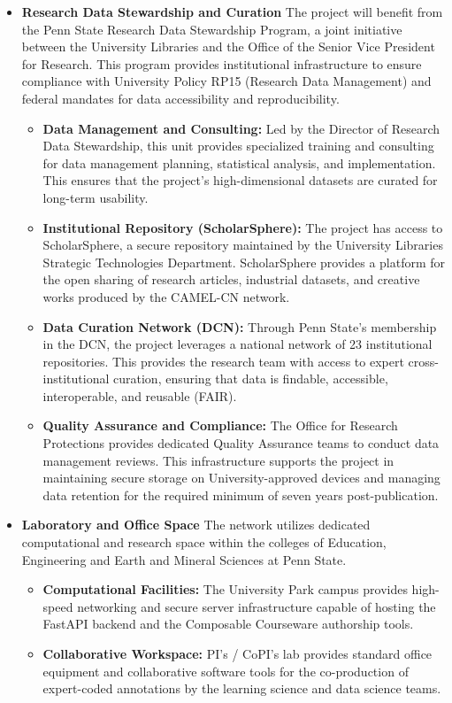\documentclass[11pt]{article}
\begin{document}
\begin{itemize}
\item \textbf{Research Data Stewardship and Curation}
The project will benefit from the Penn State Research Data Stewardship Program, a joint initiative between the University Libraries and the Office of the Senior Vice President for Research. This program provides institutional infrastructure to ensure compliance with University Policy RP15 (Research Data Management) and federal mandates for data accessibility and reproducibility.
    \begin{itemize}[noitemsep]
        \item \textbf{Data Management and Consulting:} Led by the Director of Research Data Stewardship, this unit provides specialized training and consulting for data management planning, statistical analysis, and implementation. This ensures that the project’s high-dimensional datasets are curated for long-term usability.
        \item \textbf{Institutional Repository (ScholarSphere):} The project has access to ScholarSphere, a secure repository maintained by the University Libraries Strategic Technologies Department. ScholarSphere provides a platform for the open sharing of research articles, industrial datasets, and creative works produced by the CAMEL-CN network.
        \item \textbf{Data Curation Network (DCN):} Through Penn State’s membership in the DCN, the project leverages a national network of 23 institutional repositories. This provides the research team with access to expert cross-institutional curation, ensuring that data is findable, accessible, interoperable, and reusable (FAIR).
        \item \textbf{Quality Assurance and Compliance:} The Office for Research Protections provides dedicated Quality Assurance teams to conduct data management reviews. This infrastructure supports the project in maintaining secure storage on University-approved devices and managing data retention for the required minimum of seven years post-publication.
    \end{itemize}

\item \textbf{Laboratory and Office Space}
The network utilizes dedicated computational and research space within the colleges of Education, Engineering and Earth and Mineral Sciences at Penn State.
\begin{itemize}[noitemsep]
    \item \textbf{Computational Facilities:} The University Park campus provides high-speed networking and secure server infrastructure capable of hosting the FastAPI backend and the Composable Courseware authorship tools.
    \item \textbf{Collaborative Workspace:} PI's / CoPI's lab provides standard office equipment and collaborative software tools for the co-production of expert-coded annotations by the learning science and data science teams.
\end{itemize}


\end{itemize}
\end{document}
